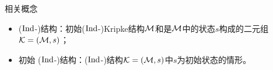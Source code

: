 \documentclass[9pt, CJK]{beamer}
\begin{document}
\begin{frame}
{			%
			\begin{block}{相关概念}
				\begin{itemize}
					\item \textcolor{blue!80}{($\textrm{Ind}$-)结构}：初始($\textrm{Ind}$-)Kripke结构${\cal M}$和是${\cal M}$中的状态$s$构成的二元组${\cal K}=({\cal M}, s)$；
					\item \textcolor{blue!80}{初始 ($\textrm{Ind}$-)结构}：($\textrm{Ind}$-)结构${\cal K}=({\cal M}, s)$中$s$为初始状态的情形。
				\end{itemize} 
				
			\end{block}
		}
	\end{frame}
	
	
\end{document}
